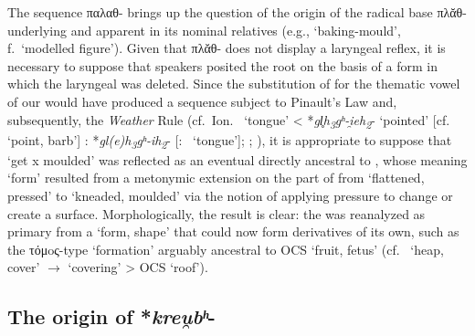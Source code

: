 \documentclass[output=paper,colorlinks,citecolor=brown]{langscibook}
\begin{document}
The sequence παλαθ- brings up the question of the origin of the radical base πλᾰθ- underlying  and apparent in its nominal relatives (e.g.,  ‘baking-mould’,  f.\ ‘modelled figure’). Given that πλᾰθ- does not display a laryngeal reflex, it is necessary to suppose that speakers posited the root on the basis of a form in which the laryngeal was deleted. Since the substitution of  for the thematic vowel of our  would have produced a sequence subject to Pinault’s Law and, subsequently, the \textit{Weather} Rule (cf.\ Ion.\  ‘tongue’ < *\textit{gl̥h\textsubscript{3}gʰ-i̯eh\textsubscript{2}}- ‘pointed’ [cf.\  ‘point, barb’] : *\textit{gl(e)h\textsubscript{3}gʰ-ih\textsubscript{2}}- \mbox{[: } ‘tongue’]; \citealt{Neri2017}; \citealt[123]{Weiss2020}), it is appropriate to suppose that  ‘get x moulded’ was reflected as an eventual  directly ancestral to , whose meaning ‘form’ resulted from a metonymic extension on the part of  from ‘flattened, pressed’ to ‘kneaded, moulded’ via the notion of applying pressure to change or create a surface. Morphologically, the result is clear: the   was reanalyzed as primary  from a  ‘form, shape’ that could now form derivatives of its own, such as the τόμoς-type  ‘formation’ arguably ancestral to OCS  ‘fruit, fetus’ (cf.\  ‘heap, cover’ $\rightarrow$  ‘covering’ > OCS  ‘roof’).

\subsection{The origin of *\textit{kreu̯bʰ}-}
\end{document}
